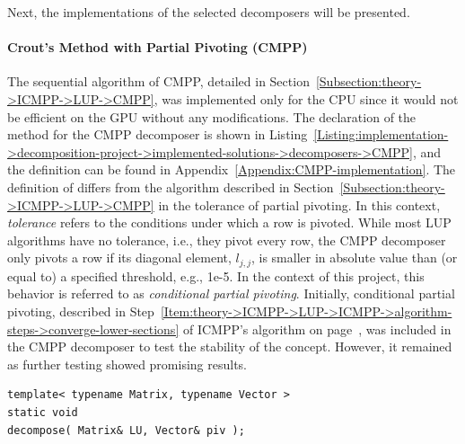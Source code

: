Next, the implementations of the selected decomposers will be presented.

\paragraph{Crout's Method with Partial Pivoting (CMPP)} The sequential algorithm of CMPP, detailed in Section~\ref{Subsection:theory->ICMPP->LUP->CMPP}, was implemented only for the CPU since it would not be efficient on the GPU without any modifications. The declaration of the  method for the CMPP decomposer is shown in Listing~\ref{Listing:implementation->decomposition-project->implemented-solutions->decomposers->CMPP}, and the definition can be found in Appendix~\ref{Appendix:CMPP-implementation}. The definition of  differs from the algorithm described in Section~\ref{Subsection:theory->ICMPP->LUP->CMPP} in the tolerance of partial pivoting. In this context, \textit{tolerance} refers to the conditions under which a row is pivoted. While most LUP algorithms have no tolerance, i.e., they pivot every row, the CMPP decomposer only pivots a row if its diagonal element, $l_{j,j}$, is smaller in absolute value than (or equal to) a specified threshold, e.g., 1e-5. In the context of this project, this behavior is referred to as \textit{conditional partial pivoting}. Initially, conditional partial pivoting, described in Step~\ref{Item:theory->ICMPP->LUP->ICMPP->algorithm-steps->converge-lower-sections} of ICMPP's algorithm on page~\pageref{Item:theory->ICMPP->LUP->ICMPP->algorithm-steps->converge-lower-sections}, was included in the CMPP decomposer to test the stability of the concept. However, it remained as further testing showed promising results.

\begin{lstlisting}[caption={The declaration of the \code{decompose()} method for the CMPP decomposer. On input, matrix \code{LU} is assumed to contain the values of $\mathbf{A}$, and \code{piv} is expected to be appropriately sized. On output, matrix \code{LU} contains the values of matrices $\mathbf{L}$ and $\mathbf{U}$ in the format presented in Equation~\ref{Equation:implementation->decomposition-project->implemented-solutions->decomposers->CMPP}, and \code{piv} contains the row permutations in the format set by cuSOLVER and cuBLAS, i.e., row \code{i} was swapped with row \code{piv[i]} \cite{5D33zKi5iStCty0r}. The template parameters, \code{Matrix} and \code{Vector}, are expected to be data structures from TNL that inherit from the \code{TNL::Matrices::DenseMatrix} and \code{TNL::Containers::Vector} types, respectively.},label={Listing:implementation->decomposition-project->implemented-solutions->decomposers->CMPP}]
template< typename Matrix, typename Vector >
static void
decompose( Matrix& LU, Vector& piv );
\end{lstlisting}

